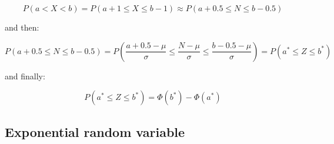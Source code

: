 \documentclass[12pt]{report}
\renewcommand{\_}{\kern-1.5pt\textunderscore\kern-1.5pt}
\begin{document}
\begin{itemize}
\begin{itemize}
 \[ P \left( a<X<b \right) =P \left( a+1 \leq X \leq b-1 \right)  \approx P \left( a+0.5 \leq N \leq b-0.5 \right)  \] \par

and then:\par

 \[ P \left( a+0.5 \leq N \leq b-0.5 \right) =P \left( \frac{a+0.5- \mu }{ \sigma } \leq \frac{N- \mu }{ \sigma } \leq \frac{b-0.5- \mu }{ \sigma } \right) =P \left( a^{\ast} \leq Z \leq b^{\ast} \right)  \] \par

and finally:\par

 \[ P \left( a^{\ast} \leq Z \leq b^{\ast} \right) = \Phi  \left( b^{\ast} \right) - \Phi  \left( a^{\ast} \right)  \] \par


\end{itemize}
\end{itemize}\subsection*{Exponential random variable}
\end{document}
